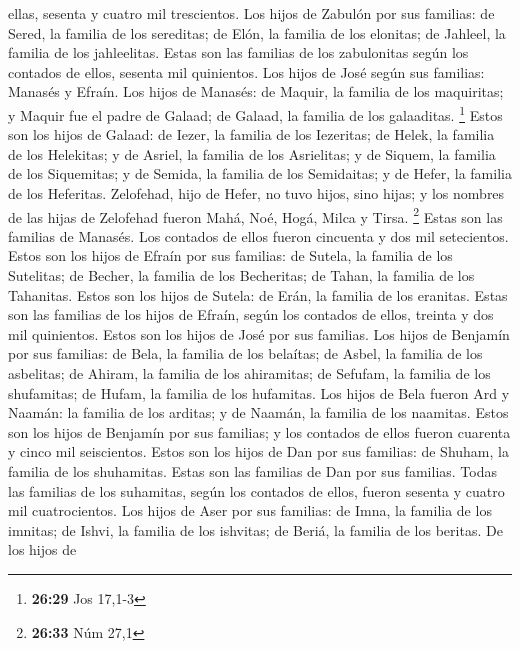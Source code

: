ellas, sesenta y cuatro mil trescientos.  Los hijos de
Zabulón por sus familias: de Sered, la familia de los sereditas; de
Elón, la familia de los elonitas; de Jahleel, la familia de los
jahleelitas.  Estas son las familias de los zabulonitas
según los contados de ellos, sesenta mil quinientos.  Los
hijos de José según sus familias: Manasés y Efraín.  Los
hijos de Manasés: de Maquir, la familia de los maquiritas; y Maquir fue
el padre de Galaad; de Galaad, la familia de los galaaditas. \footnote{\textbf{26:29}
  Jos 17,1-3}  Estos son los hijos de Galaad: de Iezer,
la familia de los Iezeritas; de Helek, la familia de los Helekitas;
 y de Asriel, la familia de los Asrielitas; y de Siquem,
la familia de los Siquemitas;  y de Semida, la familia de
los Semidaitas; y de Hefer, la familia de los Heferitas. 
Zelofehad, hijo de Hefer, no tuvo hijos, sino hijas; y los nombres de
las hijas de Zelofehad fueron Mahá, Noé, Hogá, Milca y Tirsa.
\footnote{\textbf{26:33} Núm 27,1}  Estas son las
familias de Manasés. Los contados de ellos fueron cincuenta y dos mil
setecientos.  Estos son los hijos de Efraín por sus
familias: de Sutela, la familia de los Sutelitas; de Becher, la familia
de los Becheritas; de Tahan, la familia de los Tahanitas.
 Estos son los hijos de Sutela: de Erán, la familia de
los eranitas.  Estas son las familias de los hijos de
Efraín, según los contados de ellos, treinta y dos mil quinientos. Estos
son los hijos de José por sus familias.  Los hijos de
Benjamín por sus familias: de Bela, la familia de los belaítas; de
Asbel, la familia de los asbelitas; de Ahiram, la familia de los
ahiramitas;  de Sefufam, la familia de los shufamitas; de
Hufam, la familia de los hufamitas.  Los hijos de Bela
fueron Ard y Naamán: la familia de los arditas; y de Naamán, la familia
de los naamitas.  Estos son los hijos de Benjamín por sus
familias; y los contados de ellos fueron cuarenta y cinco mil
seiscientos.  Estos son los hijos de Dan por sus
familias: de Shuham, la familia de los shuhamitas. Estas son las
familias de Dan por sus familias.  Todas las familias de
los suhamitas, según los contados de ellos, fueron sesenta y cuatro mil
cuatrocientos.  Los hijos de Aser por sus familias: de
Imna, la familia de los imnitas; de Ishvi, la familia de los ishvitas;
de Beriá, la familia de los beritas.  De los hijos de
